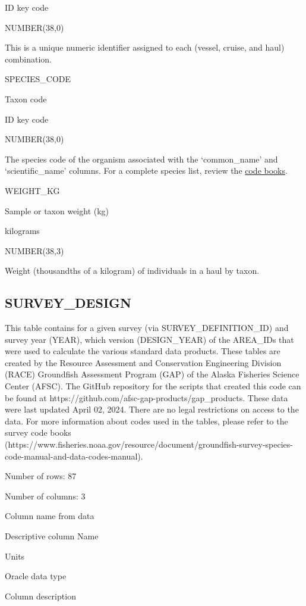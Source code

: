 \documentclass[
  letterpaper,
  oneside,
  open=any]{scrbook}
\begin{document}
ID key code

NUMBER(38,0)

This is a unique numeric identifier assigned to each (vessel, cruise,
and haul) combination.

SPECIES\_CODE

Taxon code

ID key code

NUMBER(38,0)

The species code of the organism associated with the `common\_name' and
`scientific\_name' columns. For a complete species list, review the
\href{https://www.fisheries.noaa.gov/resource/document/groundfish-survey-species-code-manual-and-data-codes-manual}{code
books}.

WEIGHT\_KG

Sample or taxon weight (kg)

kilograms

NUMBER(38,3)

Weight (thousandths of a kilogram) of individuals in a haul by taxon.

\hypertarget{survey_design}{%
\subsection{SURVEY\_DESIGN}\label{survey_design}}

This table contains for a given survey (via SURVEY\_DEFINITION\_ID) and
survey year (YEAR), which version (DESIGN\_YEAR) of the AREA\_IDs that
were used to calculate the various standard data products. These tables
are created by the Resource Assessment and Conservation Engineering
Division (RACE) Groundfish Assessment Program (GAP) of the Alaska
Fisheries Science Center (AFSC). The GitHub repository for the scripts
that created this code can be found at
https://github.com/afsc-gap-products/gap\_products. These data were last
updated April 02, 2024. There are no legal restrictions on access to the
data. For more information about codes used in the tables, please refer
to the survey code books
(https://www.fisheries.noaa.gov/resource/document/groundfish-survey-species-code-manual-and-data-codes-manual).

Number of rows: 87

Number of columns: 3

Column name from data

Descriptive column Name

Units

Oracle data type

Column description
\end{document}
